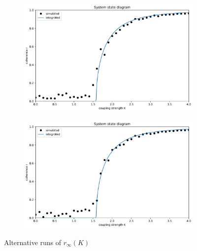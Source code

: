 \documentclass[11pt,a4paper]{article}
\begin{document}
\begin{figure}[h]
	\centering
	\begin{subfigure}{.45\textwidth}
		\includegraphics[width=1\textwidth]{graphics/1_K-vs-r_omegaDistr=normal_N=1000_1611593606.pdf}
	\end{subfigure}
	\begin{subfigure}{.45\textwidth}
		\includegraphics[width=1\textwidth]{graphics/1_K-vs-r_omegaDistr=normal_N=1000_1611599513.pdf}
	\end{subfigure}
	\caption{Alternative runs of $r_\infty(K)$}
	\label{1alt}
\end{figure}
\end{document}
